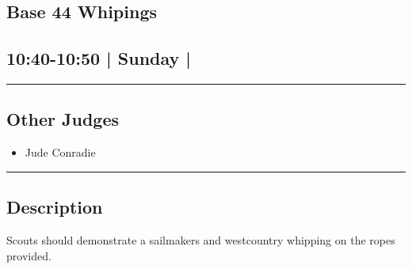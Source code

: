 \documentclass[10pt, A5]{article}
\begin{document}
		\begin{framed}
			\begin{minipage}{\textwidth}

			\setcounter{section}{103}
							\section{\faStar \: Base 44 \faStar \: Whipings}
						
			\subsection*{10:40-10:50 | Sunday | }

			\vspace{0.25cm}
			\hrule
			\vspace{0.25cm}


			\subsection*{Other Judges}
							

				\begin{multicols}{2}

			\begin{itemize}
											\item Jude Conradie
								\end{itemize}

			\vfill\null
			\columnbreak

			\begin{itemize}
								\end{itemize}

			\vfill\null

			\end{multicols}

			\vspace{0.25cm}
			\hrule
			\vspace{0.25cm}

			\begin{minipage}{\textwidth}
			\subsection*{\faListAlt \: Description}
			Scouts should demonstrate a sailmakers and westcountry whipping on the ropes provided.
			\end{minipage}


	\end{minipage}
	\end{framed}
\end{document}
